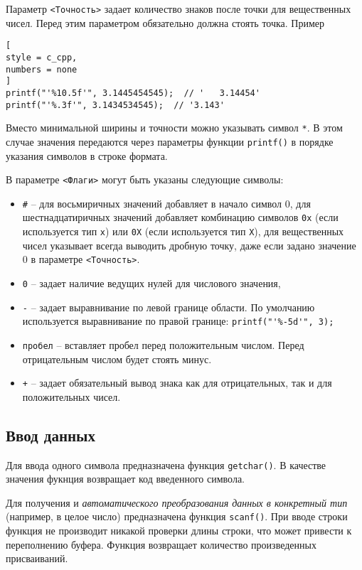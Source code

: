 \documentclass[%
	11pt,
	a4paper,
	utf8,
		]{article}
\begin{document}
Параметр \verb*|<Точность>| задает количество знаков после точки для вещественных чисел. Перед этим параметром обязательно должна стоять точка. Пример
\begin{lstlisting}[
style = c_cpp,
numbers = none
]
printf("'%10.5f'", 3.1445454545);  // '   3.14454'
printf("'%.3f'", 3.1434534545);  // '3.143'
\end{lstlisting}

Вместо минимальной ширины и точности можно указывать символ \verb*|*|. В этом случае значения передаются через параметры функции \verb*|printf()| в порядке указания символов в строке формата.

В параметре \verb|<Флаги>| могут быть указаны следующие символы:
\begin{itemize}
	\item \verb*|#| -- для восьмиричных значений добавляет в начало символ 0, для шестнадцатиричных значений добавляет комбинацию символов \verb|0x| (если используется тип \verb*|x|) или \verb|0X| (если используется тип \verb*|X|), для вещественных чисел указывает всегда выводить дробную точку, даже если задано значение 0 в параметре \verb|<Точность>|.
	
	\item \verb*|0| -- задает наличие ведущих нулей для числового значения,
	
	\item \verb|-| -- задает выравнивание по левой границе области. По умолчанию используется выравнивание по правой границе: \verb|printf("'%-5d'", 3);|
	
	\item \verb|пробел| -- вставляет пробел перед положительным числом. Перед отрицательным числом будет стоять минус.
	
	\item \verb*|+| -- задает обязательный вывод знака как для отрицательных, так и для положительных чисел.
\end{itemize}

\subsection{Ввод данных}

Для ввода одного символа предназначена функция \verb*|getchar()|. В качестве значения фукнция возвращает код введенного символа.

Для получения и \emph{автоматического преобразования данных в конкретный тип} (например, в целое число) предназначена функция \verb*|scanf()|. При вводе строки функция не производит никакой проверки длины строки, что может привести к переполнению буфера. Функция возвращает количество произведенных присваиваний.
\end{document}
